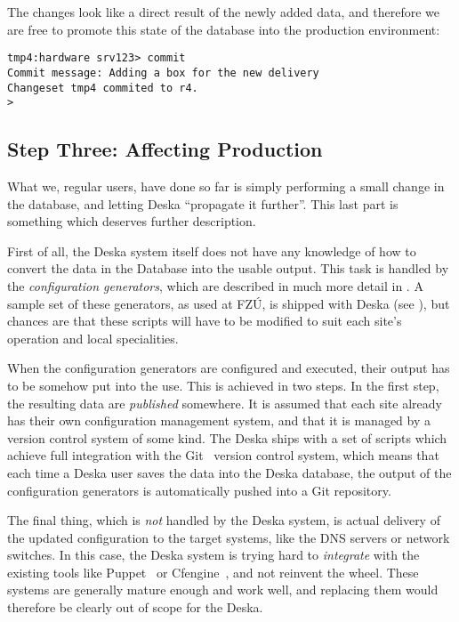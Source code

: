 \documentclass[deska]{subfiles}
\begin{document}
The changes look like a direct result of the newly added data, and therefore we are free to promote this state of the
database into the production environment:

\begin{verbatim}
tmp4:hardware srv123> commit
Commit message: Adding a box for the new delivery
Changeset tmp4 commited to r4.
>
\end{verbatim}

\subsection{Step Three: Affecting Production}

What we, regular users, have done so far is simply performing a small change in the database, and letting Deska
``propagate it further''.  This last part is something which deserves further description.

First of all, the Deska system itself does not have any knowledge of how to convert the data in the Database into the
usable output.  This task is handled by the {\em configuration generators}, which are described in much more detail in
.  A sample set of these generators, as used at FZÚ, is shipped with Deska (see
), but chances are that these scripts will have to be modified to suit each site's operation and
local specialities.

When the configuration generators are configured and executed, their output has to be somehow put into the use.  This is
achieved in two steps.  In the first step, the resulting data are {\em published} somewhere.  It is assumed that each
site already has their own configuration management system, and that it is managed by a version control system of some
kind.  The Deska ships with a set of scripts which achieve full integration with the Git~\cite{git} version control
system, which means that each time a Deska user saves the data into the Deska database, the output of the configuration
generators is automatically pushed into a Git repository.

The final thing, which is {\em not} handled by the Deska system, is actual delivery of the updated configuration to the
target systems, like the DNS servers or network switches.  In this case, the Deska system is trying hard to {\em
integrate} with the existing tools like Puppet~\cite{puppet} or Cfengine~\cite{cfengine}, and not reinvent the wheel.
These systems are generally mature enough and work well, and replacing them would therefore be clearly out of scope for
the Deska.
\end{document}
